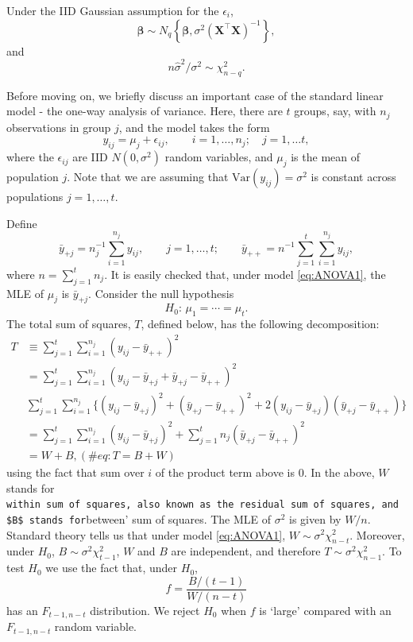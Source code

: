 \documentclass[]{book}
\theoremstyle{definition}
\theoremstyle{definition}
\theoremstyle{definition}
\theoremstyle{remark}
\begin{document}
Under the IID Gaussian assumption for the \(\epsilon_i\),
\[
\hat{\boldsymbol \beta} \sim N_q\left \{\boldsymbol \beta, \sigma^2 (\boldsymbol X^\top \boldsymbol X)^{-1}\right\},
\]
and
\[
n\hat{\sigma}^2/\sigma^2 \sim \chi_{n-q}^2.
\]

Before moving on, we briefly discuss an important case of the standard linear model - the one-way analysis of variance.
Here, there are \(t\) groups, say, with \(n_j\) observations in group \(j\), and the model takes the form
\begin{equation}
y_{ij}=\mu_j +\epsilon_{ij}, \qquad i=1, \ldots , n_j; \quad j=1, \ldots t,
\label{eq:ANOVA1}
\end{equation}
where the \(\epsilon_{ij}\) are IID \(N(0,\sigma^2)\) random variables, and \(\mu_j\) is the mean of population \(j\). Note that we are assuming that \(\text{Var}(y_{ij})=\sigma^2\)
is constant across populations \(j=1, \ldots , t\).

Define
\[
\bar{y}_{+j}=n_j^{-1}\sum_{i=1}^{n_j}y_{ij}, \qquad j=1, \ldots , t; \qquad \bar{y}_{++}=n^{-1}\sum_{j=1}^t \sum_{i=1}^{n_j}y_{ij},
\]
where \(n=\sum_{j=1}^t n_j\). It is easily checked that, under model \eqref{eq:ANOVA1}, the MLE of \(\mu_j\) is \(\bar{y}_{+j}\).
Consider the null hypothesis
\[
H_0:\, \mu_1= \cdots = \mu_t.
\]
The total sum of squares, \(T\), defined below,
has the following decomposition:
\begin{align}
T&\equiv \sum_{j=1}^t \sum_{i=1}^{n_j} (y_{ij}-\bar{y}_{++})^2 \nonumber\\
&=\sum_{j=1}^t \sum_{i=1}^{n_j} (y_{ij}-\bar{y}_{+j} + \bar{y}_{+j} -\bar{y}_{++})^2 \nonumber\\
&\sum_{j=1}^t \sum_{i=1}^{n_j} \big \{(y_{ij}-\bar{y}_{+j})^2 + (\bar{y}_{+j} -\bar{y}_{++})^2 + 2 (y_{ij}-\bar{y}_{+j}) (\bar{y}_{+j} -\bar{y}_{++})\big \} \nonumber\\
&=\sum_{j=1}^t \sum_{i=1}^{n_j} (y_{ij}-\bar{y}_{+j})^2 +\sum_{j=1}^t n_j (\bar{y}_{+j}-\bar{y}_{++})^2 \nonumber\\
&=W + B,
(\#eq:T=B+W)
\end{align}
using the fact that sum over \(i\) of the product term above is \(0\). In the above,
\(W\) stands for \texttt{within\textquotesingle{}\ sum\ of\ squares,\ also\ known\ as\ the\ residual\ sum\ of\ squares,\ and\ \$B\$\ stands\ for}between' sum of squares. The MLE of \(\sigma^2\) is given by \(W/n\). Standard theory tells us that under model \eqref{eq:ANOVA1}, \(W \sim \sigma^2 \chi_{n-t}^2\). Moreover, under \(H_0\), \(B \sim \sigma^2 \chi_{t-1}^2\), \(W\) and \(B\) are independent, and therefore \(T \sim \sigma^2 \chi_{n-1}^2\).
To test \(H_0\) we use the fact that, under \(H_0\),
\begin{equation}
f=\frac{B/(t-1)}{W/(n-t)}
\label{eq:Fstat}
\end{equation}
has an \(F_{t-1, n-t}\) distribution. We reject \(H_0\) when \(f\) is `large' compared with an \(F_{t-1,n-t}\) random variable.
\end{document}
